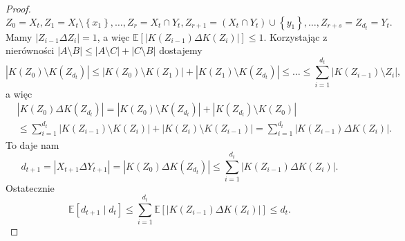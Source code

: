 \begin{proof}
	\[Z_0 = X_t, Z_1 = X_t \setminus \left\{ x_1 \right\} ,\ldots, Z_r = X_t \cap Y_t, Z_{r+1} = \left( X_t \cap Y_t \right) \cup \left\{ y_1 \right\} ,\ldots, Z_{r+s} = Z_{d_t} = Y_t .\]
	Mamy \(\left|Z_{i-1}\Delta Z_i\right|=1\), a więc \(\mathbb{E}\left[ \left|K\left( Z_{i-1} \right) \Delta K\left( Z_i \right) \right| \right] \le 1\). Korzystając z nierówności \(\left|A\setminus B \right|\le \left|A\setminus C \right|+\left|C\setminus B\right|\) dostajemy
	\[ \left|K\left( Z_0 \right) \setminus K\left( Z_{d_t} \right) \right|\le \left|K\left( Z_0 \right) \setminus K\left( Z_1 \right) \right|+ \left|K\left( Z_1 \right) \setminus K\left( Z_{d_t} \right) \right|\le \ldots\le \sum_{i=1}^{d_t} \left|K\left( Z_{i-1} \right) \setminus Z_i\right|, \]
	a więc
	\begin{align*}
		 & \left|K\left( Z_0 \right) \Delta K\left( Z_{d_t} \right) \right| = \left|K\left( Z_0 \right) \setminus  K\left( Z_{d_t} \right) \right|+ \left|K\left( Z_{d_t} \right) \setminus K\left( Z_0 \right) \right|                                        \\
		 & \le \sum_{i=1}^{d_t} \left|K\left( Z_{i-1} \right) \setminus K\left( Z_i \right) \right|+ \left|K\left( Z_i \right) \setminus K\left( Z_{i-1} \right) \right| = \sum_{i=1}^{d_t} \left|K\left( Z_{i-1}\right) \Delta K\left( Z_i \right)  \right| .
	\end{align*}
	To daje nam
	\[ d_{t+1} = \left|X_{t+1}\Delta Y_{t+1}\right| = \left|K\left( Z_0 \right) \Delta K\left( Z_{d_t} \right) \right|\le \sum_{i=1}^{d_t} \left|K\left( Z_{i-1} \right) \Delta K\left( Z_i \right) \right|. \]
	Ostatecznie
	\[ \mathbb{E}\left[ d_{t+1} \mid d_t \right] \le \sum_{i=1}^{d_t} \mathbb{E}\left[ \left|K\left( Z_{i-1} \right) \Delta K\left( Z_i \right) \right| \right] \le d_t. \]
\end{proof}


